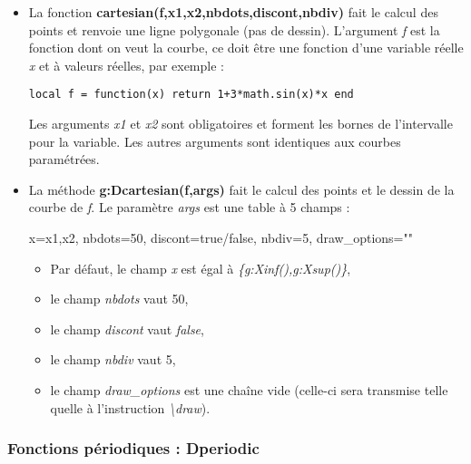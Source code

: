 \documentclass[%
10pt,%
a4paper,%
french,%
]%
{article}%
\begin{document}
\begin{itemize}
\item La fonction \textbf{cartesian(f,x1,x2,nbdots,discont,nbdiv)} fait le calcul des points et renvoie une ligne polygonale (pas de dessin). L'argument \emph{f} est la fonction dont on veut la courbe, ce doit être une fonction d'une variable réelle \emph{x} et à valeurs réelles, par exemple :

    \texttt{local f = function(x) return 1+3*math.sin(x)*x end}

    Les arguments \emph{x1} et \emph{x2} sont obligatoires et forment les bornes de l'intervalle pour la variable. Les autres arguments sont identiques aux courbes paramétrées.

\item La méthode \textbf{g:Dcartesian(f,args)} fait le calcul des points et le dessin de la courbe de \emph{f}. Le paramètre \emph{args} est une table à 5 champs :

\begin{TeXcode}
  { x={x1,x2}, nbdots=50, discont=true/false, nbdiv=5, draw_options="" }
\end{TeXcode}
  
  \begin{itemize}
      \item   Par défaut, le champ \emph{x} est égal à \emph{\{g:Xinf(),g:Xsup()\}}, 
      \item le champ \emph{nbdots} vaut 50, 
      \item le champ \emph{discont} vaut \emph{false}, 
      \item le champ \emph{nbdiv} vaut 5, 
      \item le champ \emph{draw\_options} est une chaîne vide (celle-ci sera transmise telle quelle à l'instruction \emph{\textbackslash draw}).
  \end{itemize}
\end{itemize}

\subsubsection{Fonctions périodiques : Dperiodic}
\end{document}
